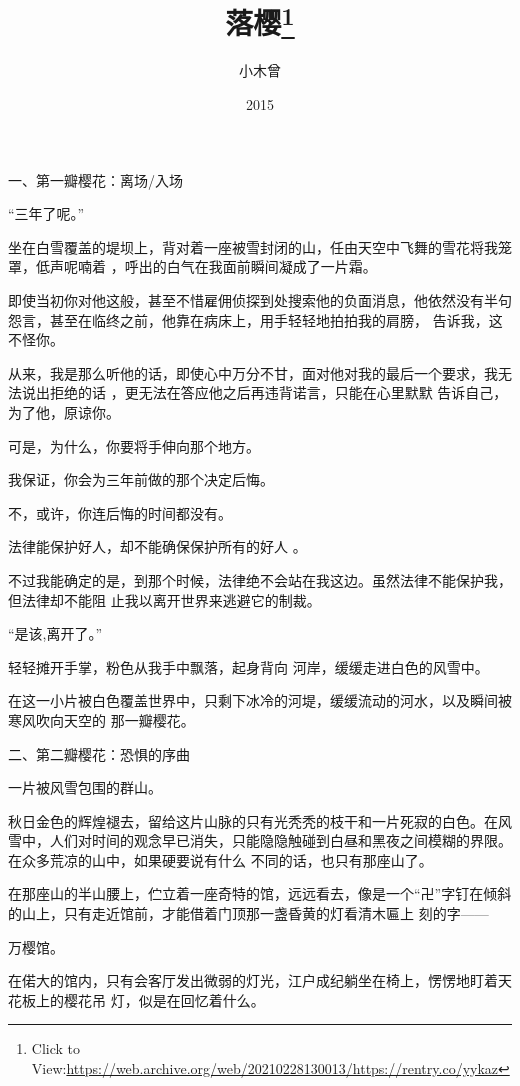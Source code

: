 \documentclass{article}
\title{落樱\footnote{Click to View:\url{https://web.archive.org/web/20210228130013/https://rentry.co/yykaz}}}
\author{小木曾}
\date{2015}
\begin{document}

\maketitle


\Large


﻿一、第一瓣樱花：离场/入场 


“三年了呢。” 

坐在白雪覆盖的堤坝上，背对着一座被雪封闭的山，任由天空中飞舞的雪花将我笼罩，低声呢喃着
，呼出的白气在我面前瞬间凝成了一片霜。 

即使当初你对他这般，甚至不惜雇佣侦探到处搜索他的负面消息，他依然没有半句怨言，甚至在临终之前，他靠在病床上，用手轻轻地拍拍我的肩膀，
告诉我，这不怪你。 

从来，我是那么听他的话，即使心中万分不甘，面对他对我的最后一个要求，我无法说出拒绝的话
\newpage
，更无法在答应他之后再违背诺言，只能在心里默默
告诉自己，为了他，原谅你。 


可是，为什么，你要将手伸向那个地方。 


我保证，你会为三年前做的那个决定后悔。 


不，或许，你连后悔的时间都没有。 

法律能保护好人，却不能确保保护所有的好人
。 

不过我能确定的是，到那个时候，法律绝不会站在我这边。虽然法律不能保护我，但法律却不能阻
止我以离开世界来逃避它的制裁。 


“是该,离开了。” 

轻轻摊开手掌，粉色从我手中飘落，起身背向
河岸，缓缓走进白色的风雪中。 

\newpage

在这一小片被白色覆盖世界中，只剩下冰冷的河堤，缓缓流动的河水，以及瞬间被寒风吹向天空的
那一瓣樱花。 


二、第二瓣樱花：恐惧的序曲 


一片被风雪包围的群山。 

秋日金色的辉煌褪去，留给这片山脉的只有光秃秃的枝干和一片死寂的白色。在风雪中，人们对时间的观念早已消失，只能隐隐触碰到白昼和黑夜之间模糊的界限。在众多荒凉的山中，如果硬要说有什么
不同的话，也只有那座山了。 

在那座山的半山腰上，伫立着一座奇特的馆，远远看去，像是一个“卍”字钉在倾斜的山上，只有走近馆前，才能借着门顶那一盏昏黄的灯看清木匾上
刻的字—— 


万樱馆。 

\newpage

在偌大的馆内，只有会客厅发出微弱的灯光，江户成纪躺坐在椅上，愣愣地盯着天花板上的樱花吊
灯，似是在回忆着什么。 
\end{document}
